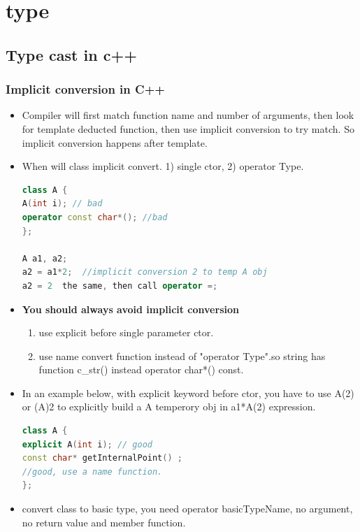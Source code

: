 \documentclass[a4paper,12pt,twoside]{book}
\begin{document}
\section{type}

\subsection{Type cast in c++}

\subsubsection{Implicit conversion in C++}
\begin{itemize}
\item Compiler will first match function name and number of arguments, then look for template deducted function, then use implicit conversion to try match. So implicit conversion happens after template.

\item When will class implicit convert. 1) single ctor, 2) operator Type.
\begin{lstlisting}[frame=single, language=c++]
class A {
A(int i); // bad
operator const char*(); //bad
};

A a1, a2;
a2 = a1*2;  //implicit conversion 2 to temp A obj
a2 = 2  the same, then call operator =;
\end{lstlisting}

\item \textbf{You should always avoid implicit conversion}
\begin{enumerate}
\item use explicit before single parameter ctor.
\item use name convert function instead of  "operator Type".so string has function c\_str() instead operator char*() const. 
\end{enumerate}

\item In an example below, with explicit keyword before ctor,  you have to use A(2) or (A)2 to explicitly build a A temperory obj in a1*A(2) expression.
\begin{lstlisting}[frame=single, language=c++]
class A {
explicit A(int i); // good
const char* getInternalPoint() ;
//good, use a name function.
};
\end{lstlisting}

\item  convert class to basic type, you need operator basicTypeName, no argument, no return value and member function.


\end{itemize}
\end{document}
